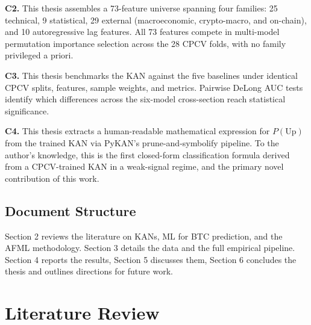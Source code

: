 \documentclass[12pt,a4paper,oneside]{article}
\begin{document}
\textbf{C2.} This thesis assembles a 73-feature universe spanning four families: 25 technical, 9 statistical, 29 external (macroeconomic, crypto-macro, and on-chain), and 10 autoregressive lag features. All 73 features compete in multi-model permutation importance selection across the 28 CPCV folds, with no family privileged a priori.

\textbf{C3.} This thesis benchmarks the KAN against the five baselines under identical CPCV splits, features, sample weights, and metrics. Pairwise DeLong AUC tests identify which differences across the six-model cross-section reach statistical significance.

\textbf{C4.} This thesis extracts a human-readable mathematical expression for $P(\text{Up})$ from the trained KAN via PyKAN's prune-and-symbolify pipeline. To the author's knowledge, this is the first closed-form classification formula derived from a CPCV-trained KAN in a weak-signal regime, and the primary novel contribution of this work.


\subsection{Document Structure}\label{subsec:structure}

Section 2 reviews the literature on KANs, ML for BTC prediction, and the AFML methodology. Section 3 details the data and the full empirical pipeline. Section 4 reports the results, Section 5 discusses them, Section 6 concludes the thesis and outlines directions for future work.


\newpage
\section{Literature Review}\label{sec:literature}

%
\end{document}
